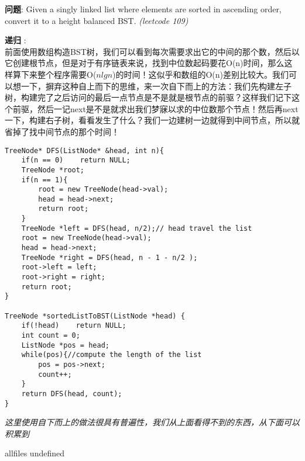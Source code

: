 \documentclass{article}
\begin{document}
\begin{CJK}{UTF8}{gbsn}     %

\else
    
\begin{description}
    \item{\textbf{问题}}: Given a singly linked list where elements are sorted in ascending order, convert it to a height balanced BST. \textit{(leetcode 109)}
    \item{\textbf{递归}} : 
    \\前面使用数组构造BST树，我们可以看到每次需要求出它的中间的那个数，然后以它创建根节点，但是对于有序链表来说，找到中位数起码要花O(n)时间，那么这样算下来整个程序需要O($nlgn$)的时间！这似乎和数组的O(n)差别比较大。我们可以想一下，摒弃这种自上而下的思维，来一次自下而上的方法：我们先构建左子树，构建完了之后访问的最后一点节点是不是就是根节点的前驱？这样我们记下这个前驱，然后一记next是不是就求出我们梦寐以求的中位数那个节点！然后再next一下，构建右子树，看看发生了什么？我们一边建树一边就得到中间节点，所以就省掉了找中间节点的那个时间！
    \begin{lstlisting}
TreeNode* DFS(ListNode* &head, int n){
    if(n == 0)    return NULL;
    TreeNode *root;
    if(n == 1){
        root = new TreeNode(head->val);
        head = head->next;
        return root;
    }
    TreeNode *left = DFS(head, n/2);// head travel the list
    root = new TreeNode(head->val);
    head = head->next; 
    TreeNode *right = DFS(head, n - 1 - n/2 );
    root->left = left;
    root->right = right;
    return root;
}

TreeNode *sortedListToBST(ListNode *head) {
    if(!head)    return NULL;
    int count = 0;
    ListNode *pos = head;
    while(pos){//compute the length of the list
        pos = pos->next;
        count++;
    }
    return DFS(head, count);
}
    \end{lstlisting}
    \textit{这里使用自下而上的做法很具有普遍性，我们从上面看得不到的东西，从下面可以积累到}
\end{description}

\fi

\ifx allfiles undefined
\end{CJK}
\end{document}
